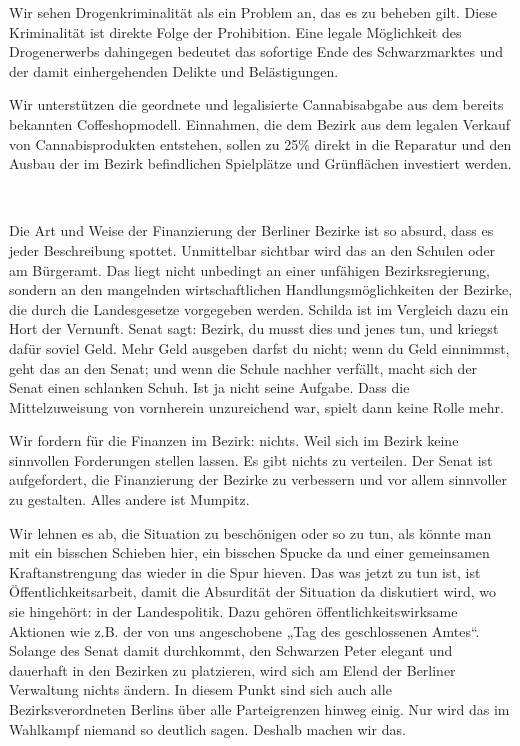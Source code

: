 \documentclass[a4paper,10pt]{article}
\newcommand{\mysection}[1]{{\vspace{1cm}\noindent\color{gray}{\ttfamily\LARGE\raggedright #1}\\\medskip}}
\newcommand{\abschnitt}[2]{%
\mysection{\raggedright #1}%
\begin{figure}[t]%
\vspace*{-2.7cm}%
\hspace*{-2.1cm}%
\texttt{[image: images/blog/small/\#2]} %
\end{figure}%
}
\begin{document}
Wir sehen Drogenkriminalität als ein Problem an, das es zu beheben gilt.
Diese Kriminalität ist direkte Folge der Prohibition. Eine legale
Möglichkeit des Drogenerwerbs dahingegen bedeutet das sofortige Ende des
Schwarzmarktes und der damit einhergehenden Delikte und Belästigungen.

Wir unterstützen die geordnete und legalisierte Cannabisabgabe aus dem
bereits bekannten Coffeshopmodell. Einnahmen, die dem Bezirk aus dem
legalen Verkauf von Cannabisprodukten entstehen, sollen zu 25\% direkt
in die Reparatur und den Ausbau der im Bezirk befindlichen Spielplätze
und Grünflächen investiert werden.

\mysection{Finanzen}

Die Art und Weise der Finanzierung der Berliner Bezirke ist so absurd,
dass es jeder Beschreibung spottet. Unmittelbar sichtbar wird das an den
Schulen oder am Bürgeramt. Das liegt nicht unbedingt an einer unfähigen
Bezirksregierung, sondern an den mangelnden wirtschaftlichen
Handlungsmöglichkeiten der Bezirke, die durch die Landesgesetze
vorgegeben werden. Schilda ist im Vergleich dazu ein Hort der Vernunft.
Senat sagt: Bezirk, du musst dies und jenes tun, und kriegst dafür
soviel Geld. Mehr Geld ausgeben darfst du nicht; wenn du Geld einnimmst,
geht das an den Senat; und wenn die Schule nachher verfällt, macht sich
der Senat einen schlanken Schuh. Ist ja nicht seine Aufgabe. Dass die
Mittelzuweisung von vornherein unzureichend war, spielt dann keine Rolle
mehr.

Wir fordern für die Finanzen im Bezirk: nichts. Weil sich im Bezirk
keine sinnvollen Forderungen stellen lassen. Es gibt nichts zu
verteilen. Der Senat ist aufgefordert, die Finanzierung der Bezirke zu
verbessern und vor allem sinnvoller zu gestalten. Alles andere ist
Mumpitz.

Wir lehnen es ab, die Situation zu beschönigen oder so zu tun, als
könnte man mit ein bisschen Schieben hier, ein bisschen Spucke da und
einer gemeinsamen Kraftanstrengung das wieder in die Spur hieven. Das
was jetzt zu tun ist, ist Öffentlichkeitsarbeit, damit die Absurdität
der Situation da diskutiert wird, wo sie hingehört: in der
Landespolitik. Dazu gehören öffentlichkeitswirksame Aktionen wie z.B.
der von uns angeschobene „Tag des geschlossenen Amtes``. Solange des
Senat damit durchkommt, den Schwarzen Peter elegant und dauerhaft in den
Bezirken zu platzieren, wird sich am Elend der Berliner Verwaltung
nichts ändern. In diesem Punkt sind sich auch alle Bezirksverordneten
Berlins über alle Parteigrenzen hinweg einig. Nur wird das im Wahlkampf
niemand so deutlich sagen. Deshalb machen wir das.
\end{document}
